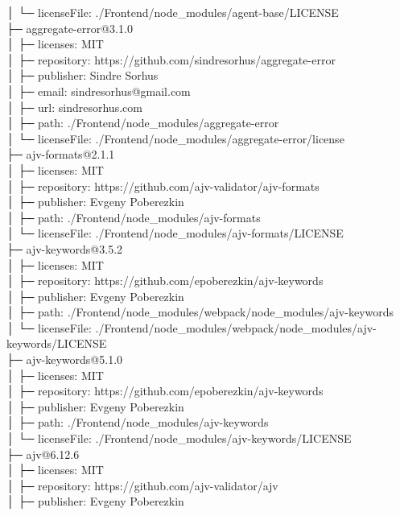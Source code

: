 │  └─ licenseFile: ./Frontend/node\_modules/agent-base/LICENSE\\
├─ aggregate-error@3.1.0\\
│  ├─ licenses: MIT\\
│  ├─ repository: https://github.com/sindresorhus/aggregate-error\\
│  ├─ publisher: Sindre Sorhus\\
│  ├─ email: sindresorhus@gmail.com\\
│  ├─ url: sindresorhus.com\\
│  ├─ path: ./Frontend/node\_modules/aggregate-error\\
│  └─ licenseFile: ./Frontend/node\_modules/aggregate-error/license\\
├─ ajv-formats@2.1.1\\
│  ├─ licenses: MIT\\
│  ├─ repository: https://github.com/ajv-validator/ajv-formats\\
│  ├─ publisher: Evgeny Poberezkin\\
│  ├─ path: ./Frontend/node\_modules/ajv-formats\\
│  └─ licenseFile: ./Frontend/node\_modules/ajv-formats/LICENSE\\
├─ ajv-keywords@3.5.2\\
│  ├─ licenses: MIT\\
│  ├─ repository: https://github.com/epoberezkin/ajv-keywords\\
│  ├─ publisher: Evgeny Poberezkin\\
│  ├─ path: ./Frontend/node\_modules/webpack/node\_modules/ajv-keywords\\
│  └─ licenseFile: ./Frontend/node\_modules/webpack/node\_modules/ajv-keywords/LICENSE\\
├─ ajv-keywords@5.1.0\\
│  ├─ licenses: MIT\\
│  ├─ repository: https://github.com/epoberezkin/ajv-keywords\\
│  ├─ publisher: Evgeny Poberezkin\\
│  ├─ path: ./Frontend/node\_modules/ajv-keywords\\
│  └─ licenseFile: ./Frontend/node\_modules/ajv-keywords/LICENSE\\
├─ ajv@6.12.6\\
│  ├─ licenses: MIT\\
│  ├─ repository: https://github.com/ajv-validator/ajv\\
│  ├─ publisher: Evgeny Poberezkin\\
